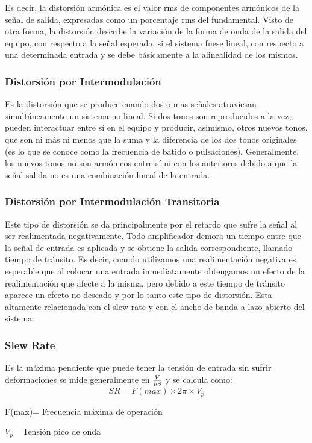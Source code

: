 Es decir, la distorsión armónica es el valor rms de componentes armónicos de la señal de salida, expresadas como un porcentaje rms del fundamental.
Visto de otra forma, la distorsión describe la variación de la forma de onda de la salida del equipo, con respecto a la señal esperada, si el sistema fuese lineal, con respecto a una determinada entrada y se debe básicamente a la alinealidad de los mismos.
\medskip 
\subsubsection*{Distorsión por Intermodulación}


Es la distorsión que se produce cuando dos o mas señales atraviesan simultáneamente un sistema no lineal. Si dos tonos son reproducidos a la vez, pueden interactuar entre sí en el equipo y producir, asimismo, otros nuevos tonos, que son ni más ni menos que la suma y la diferencia de los dos tonos originales (es lo que se conoce como la frecuencia de batido o pulsaciones). Generalmente, los nuevos tonos no son armónicos entre sí ni con los anteriores debido a que la señal salida no es una combinación lineal de la entrada.
\medskip 
\subsubsection*{Distorsión por Intermodulación Transitoria}


Este tipo de distorsión se da principalmente por el retardo que sufre la señal al ser realimentada negativamente. Todo amplificador demora un tiempo entre que la señal de entrada es aplicada y se obtiene la salida correspondiente, llamado tiempo de tránsito. Es decir, cuando utilizamos una realimentación negativa es esperable que al colocar una entrada inmediatamente obtengamos un efecto de la realimentación que afecte a la misma, pero debido a este tiempo de tránsito aparece un efecto no deseado y por lo tanto este tipo de distorsión. Esta altamente relacionada con el slew rate y con el ancho de banda a lazo abierto del sistema. 
\medskip 
\subsubsection*{Slew Rate}
	
Es la máxima pendiente que puede tener la tensión de entrada sin sufrir deformaciones se mide generalmente en $\frac{V}{\mu\mbox{s}}$ y se calcula como:
\begin{equation}
SR = F(max) \times 2\pi \times V_p
\end{equation}
\begin{description}
\item F(max)= Frecuencia máxima de operación
\item  $V_p$= Tensión pico de onda
\end{description}
\medskip 
